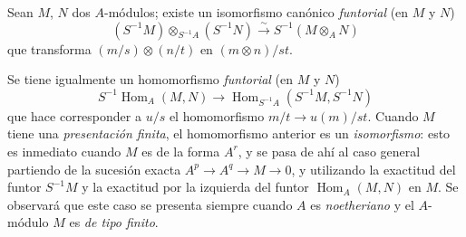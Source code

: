 \begin{env}[1.3.4]
\label{0.1.3.4-fr}
Sean $M$, $N$ dos $A$-módulos; existe un isomorfismo canónico \emph{funtorial} (en $M$ y $N$)
\[
  (S^{-1}M)\otimes_{S^{-1}A}(S^{-1}N)
  \xrightarrow{\sim}
  S^{-1}(M\otimes_A N)
\]
que transforma $(m/s)\otimes(n/t)$ en $(m\otimes n)/st$.
\end{env}

\begin{env}[1.3.5]
\label{0.1.3.5-fr}
Se tiene igualmente un homomorfismo \emph{funtorial} (en $M$ y $N$)
\[
  S^{-1}\operatorname{Hom}_A(M,N)
  \longrightarrow
  \operatorname{Hom}_{S^{-1}A}(S^{-1}M,S^{-1}N)
\]
que hace corresponder a $u/s$ el homomorfismo $m/t\to u(m)/st$.
Cuando $M$ tiene una \emph{presentación finita}, el homomorfismo anterior es un \emph{isomorfismo}: esto es inmediato cuando $M$ es de la forma $A^r$, y se pasa de ahí al caso general partiendo de la sucesión exacta $A^p\to A^q\to M\to 0$, y utilizando la exactitud del funtor $S^{-1}M$ y la exactitud por la izquierda del funtor $\operatorname{Hom}_A(M,N)$ en $M$.
Se observará que este caso se presenta siempre cuando $A$ es \emph{noetheriano} y el $A$-módulo $M$ es \emph{de tipo finito}.
\end{env}
